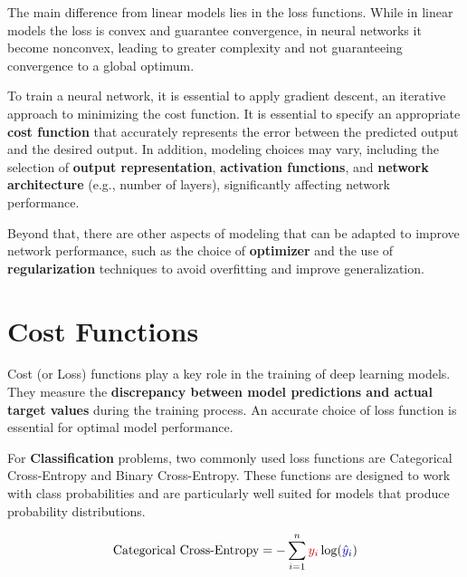 The main difference from linear models lies in the loss functions. While in linear models the loss is convex and guarantee convergence, in neural networks it become nonconvex, leading to greater complexity and not guaranteeing convergence to a global optimum.

To train a neural network, it is essential to apply gradient descent, an iterative approach to minimizing the cost function. It is essential to specify an appropriate \textbf{cost function} that accurately represents the error between the predicted output and the desired output. In addition, modeling choices may vary, including the selection of \textbf{output representation}, \textbf{activation functions}, and \textbf{network architecture} (e.g., number of layers), significantly affecting network performance.

Beyond that, there are other aspects of modeling that can be adapted to improve network performance, such as the choice of \textbf{optimizer} and the use of \textbf{regularization} techniques to avoid overfitting and improve generalization.

\section{Cost Functions}

Cost (or Loss) functions play a key role in the training of deep learning models. They measure the \textbf{discrepancy between model predictions and actual target values} during the training process. An accurate choice of loss function is essential for optimal model performance.

For \textbf{Classification} problems, two commonly used loss functions are Categorical Cross-Entropy and Binary Cross-Entropy. These functions are designed to work with class probabilities and are particularly well suited for models that produce probability distributions.

{\Large
\begin{equation*}
\text{Categorical Cross-Entropy} = -\sum_{i=1}^{n} \tikzmarkk{Y}\textcolor{myred}{y_i} \log(\tikzmarkk{YC}\textcolor{myblue!80!black}{\hat{y}_i})
\end{equation*}
}

